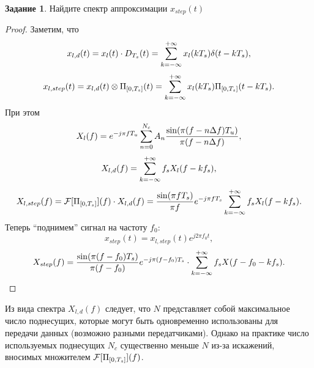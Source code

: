 \documentclass{book}
\numberwithin{theorem}{chapter}
\numberwithin{statement}{chapter}
\numberwithin{lemma}{chapter}
\theoremstyle{definition}
\newtheorem{task}{Задание}
\numberwithin{task}{chapter}
\theoremstyle{remark}
\numberwithin{example}{chapter}
\theoremstyle{definition}
\numberwithin{definition}{chapter}
\theoremstyle{remark}
\theoremstyle{remark}
\numberwithin{lyrics}{section}
\begin{document}
\begin{task}
\label{task:phy:ofdm:fft_ofdm}
Найдите спектр аппроксимации $x_{step}(t)$
\end{task}
\begin{proof}
Заметим, что
$$x_{l, d}(t) = x_l(t) \cdot D_{T_s}(t) = \sum\limits_{k = -\infty}^{+\infty} x_l(kT_s)\delta(t - kT_s),$$
$$x_{l, step}(t) = x_{l, d}(t) \otimes \Pi_{[0, T_s]}(t) = \sum\limits_{k=-\infty}^{+\infty} x_l(kT_s) \Pi_{[0, T_s]}(t - kT_s).$$
При этом 
$$X_l(f) = e^{-j\pi f T_u}\sum\limits_{n = 0}^{N_c} A_n \frac{\sin (\pi (f - n \Delta f) T_u)}{\pi (f - n \Delta f)},$$
$$X_{l,d}(f) = \sum\limits_{k = -\infty}^{+\infty} f_s X_l(f - kf_s),$$
$$X_{l, step}(f) = \mathcal{F}[\Pi_{[0, T_s]}](f) \cdot X_{l, d}(f) = \frac{\sin (\pi f T_s)}{\pi f} e^{-j \pi f T_s}\sum\limits_{k = -\infty}^{+\infty} f_s X_{l}(f - kf_s).$$
Теперь ``поднимем'' сигнал на частоту $f_0$:
$$
x_{step}(t) = x_{l, step}(t) e^{j2\pi f_0 t},$$
$$
X_{step}(f) = \frac{\sin (\pi (f - f_0) T_s)}{\pi (f - f_0)} e^{-j \pi (f - f_0) T_s} \cdot \sum\limits_{k = -\infty}^{+\infty} f_s X(f - f_0 - kf_s).
$$
\end{proof}
Из вида спектра $X_{l, d}(f)$ следует, что $N$ представляет собой максимальное число поднесущих, которые могут быть одновременно использованы для передачи данных (возможно разными передатчиками). Однако на практике число используемых поднесущих $N_c$ существенно меньше $N$ из-за искажений, вносимых множителем $\mathcal{F}[\Pi_{[0, T_s]}](f)$. 

\end{document}
